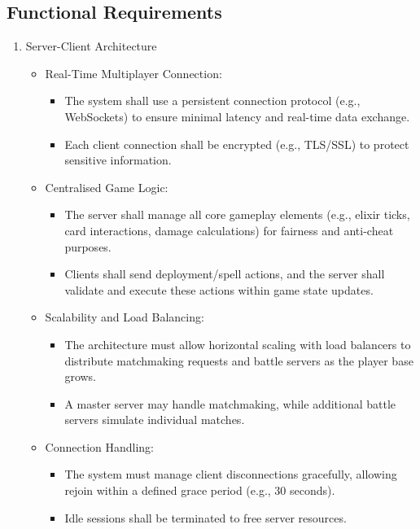 \documentclass{article}
\begin{document}
\subsection{Functional Requirements}
\begin{enumerate}[label=\textbf{FR\arabic*:}]
    \item Server-Client Architecture
    \begin{itemize}
        \item Real-Time Multiplayer Connection:
        \begin{itemize}
            \item The system shall use a persistent connection protocol (e.g., WebSockets) to ensure minimal latency and real-time data exchange.
            \item Each client connection shall be encrypted (e.g., TLS/SSL) to protect sensitive information.
        \end{itemize}
        \item Centralised Game Logic:
        \begin{itemize}
            \item The server shall manage all core gameplay elements (e.g., elixir ticks, card interactions, damage calculations) for fairness and anti-cheat purposes.
            \item Clients shall send deployment/spell actions, and the server shall validate and execute these actions within game state updates.
        \end{itemize}
        \item Scalability and Load Balancing:
        \begin{itemize}
            \item The architecture must allow horizontal scaling with load balancers to distribute matchmaking requests and battle servers as the player base grows.
            \item A master server may handle matchmaking, while additional battle servers simulate individual matches.
        \end{itemize}
        \item Connection Handling:
        \begin{itemize}
            \item The system must manage client disconnections gracefully, allowing rejoin within a defined grace period (e.g., 30 seconds).
            \item Idle sessions shall be terminated to free server resources.
        \end{itemize}
    \end{itemize}
    

\end{enumerate}
\end{document}
